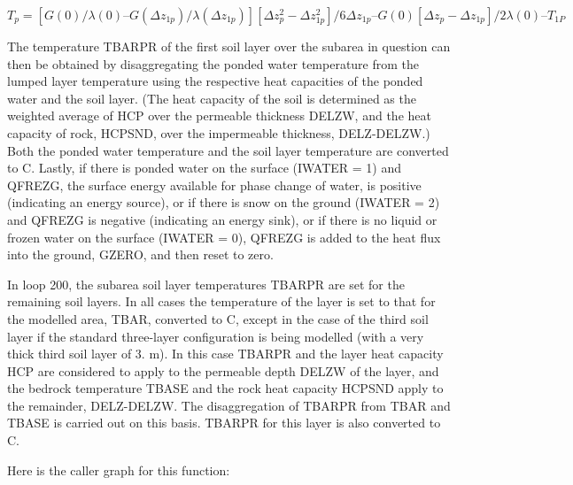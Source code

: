 $T_p = [G(0)/ \lambda(0) – G(\Delta z_{1p})/ \lambda(\Delta z_{1p})] [\Delta z_p^2 - \Delta z_{1p}^2]/ 6 \Delta z_{1p} – G(0) [\Delta z_p - \Delta z_{1p}]/ 2 \lambda(0) – T_{1P}$

The temperature T\+B\+A\+R\+P\+R of the first soil layer over the subarea in question can then be obtained by disaggregating the ponded water temperature from the lumped layer temperature using the respective heat capacities of the ponded water and the soil layer. (The heat capacity of the soil is determined as the weighted average of H\+C\+P over the permeable thickness D\+E\+L\+Z\+W, and the heat capacity of rock, H\+C\+P\+S\+N\+D, over the impermeable thickness, D\+E\+L\+Z-\/\+D\+E\+L\+Z\+W.) Both the ponded water temperature and the soil layer temperature are converted to C. Lastly, if there is ponded water on the surface (I\+W\+A\+T\+E\+R = 1) and Q\+F\+R\+E\+Z\+G, the surface energy available for phase change of water, is positive (indicating an energy source), or if there is snow on the ground (I\+W\+A\+T\+E\+R = 2) and Q\+F\+R\+E\+Z\+G is negative (indicating an energy sink), or if there is no liquid or frozen water on the surface (I\+W\+A\+T\+E\+R = 0), Q\+F\+R\+E\+Z\+G is added to the heat flux into the ground, G\+Z\+E\+R\+O, and then reset to zero.

In loop 200, the subarea soil layer temperatures T\+B\+A\+R\+P\+R are set for the remaining soil layers. In all cases the temperature of the layer is set to that for the modelled area, T\+B\+A\+R, converted to C, except in the case of the third soil layer if the standard three-\/layer configuration is being modelled (with a very thick third soil layer of 3. m). In this case T\+B\+A\+R\+P\+R and the layer heat capacity H\+C\+P are considered to apply to the permeable depth D\+E\+L\+Z\+W of the layer, and the bedrock temperature T\+B\+A\+S\+E and the rock heat capacity H\+C\+P\+S\+N\+D apply to the remainder, D\+E\+L\+Z-\/\+D\+E\+L\+Z\+W. The disaggregation of T\+B\+A\+R\+P\+R from T\+B\+A\+R and T\+B\+A\+S\+E is carried out on this basis. T\+B\+A\+R\+P\+R for this layer is also converted to C.

Here is the caller graph for this function\+:


